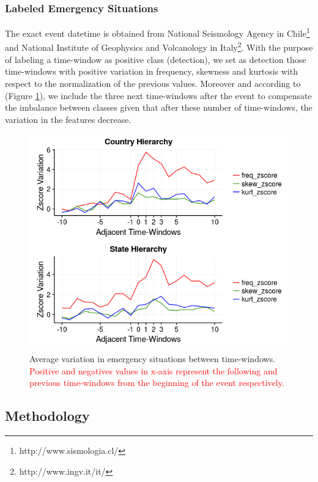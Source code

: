 \documentclass[sigconf]{acmart}
\begin{document}
\subsubsection{Labeled Emergency Situations}

The exact event datetime is obtained from National Seismology Agency in Chile\footnote{http://www.sismologia.cl/} and 
National Institute of Geophysics and Volcanology in Italy\footnote{http://www.ingv.it/it/}. With the purpose of labeling a time-window as positive class (detection), we set as detection those time-windows with positive variation in frequency, skewness and kurtosis with respect to the normalization of the previous values. Moreover and according to (Figure \ref{fig:labeled}), we include the three next time-windows after the event to compensate the imbalance between classes given that after these number of time-windows, the variation in the features decrease.


\begin{figure}
	\centering
	\includegraphics[width=\columnwidth]{img/labeled2.png}
	\caption{Average variation in emergency situations between time-windows. \textcolor{red}{Positive and negatives values in x-axis represent the following and previous time-windows from the beginning of the event respectively.}}
	\label{fig:labeled}
\end{figure}



\subsection{Methodology}\label{sec:methodology}
\end{document}
